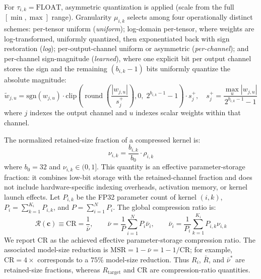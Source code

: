 \documentclass[preprint,12pt,authoryear]{elsarticle}
\begin{document}
\noindent For $\tau_{i,k} = \mathrm{FLOAT}$, asymmetric quantization is applied (scale
from the full $[\min,\max]$ range). Granularity $\mu_{i,k}$ selects among four
operationally distinct schemes: per-tensor uniform (\textit{uniform}); log-domain
per-tensor, where weights are log-transformed, uniformly quantized, then exponentiated
back with sign restoration (\textit{log}); per-output-channel uniform or asymmetric
(\textit{per-channel}); and per-channel sign-magnitude (\textit{learned}), where one
explicit bit per output channel stores the sign and the remaining $(b_{i,k}-1)$ bits
uniformly quantize the absolute magnitude:
\begin{equation}
    \tilde{w}_{j,u} = \mathrm{sgn}(w_{j,u}) \cdot
        \mathrm{clip}\!\left(
            \operatorname{round}\!\left(\frac{|w_{j,u}|}{s_j^+}\right),
            0,\; 2^{b_{i,k}-1}-1
        \right) \cdot s_j^+,
    \quad
    s_j^+ = \frac{\max_u|w_{j,u}|}{2^{b_{i,k}-1}-1}
    \label{eq:sign_magnitude}
\end{equation}
where $j$ indexes the output channel and $u$ indexes scalar weights within that channel.

The normalized retained-size fraction of a compressed kernel is:
\begin{equation}
    \nu_{i,k} = \frac{b_{i,k}}{b_0} \cdot \rho_{i,k}
    \label{eq:compression_ratio}
\end{equation}
where $b_0 = 32$ and $\nu_{i,k}\in(0,1]$. This quantity is an effective
parameter-storage fraction: it combines low-bit storage with the retained-channel fraction
and does not include hardware-specific indexing overheads, activation memory, or kernel
launch effects. Let $P_{i,k}$ be the FP32 parameter count of kernel $(i,k)$,
$P_i=\sum_{k=1}^{K_i}P_{i,k}$, and $P=\sum_{i=1}^{N}P_i$. The global compression ratio is:
\begin{equation}
    \mathcal{R}(\mathbf{c}) \equiv \mathrm{CR} = \frac{1}{\bar{\nu}},
    \qquad
    \bar{\nu} = \frac{1}{P} \sum_{i=1}^{N} P_i\bar{\nu}_i,
    \qquad
    \bar{\nu}_i = \frac{1}{P_i} \sum_{k=1}^{K_i} P_{i,k}\nu_{i,k}
    \label{eq:global_cr}
\end{equation}
\noindent We report CR as the achieved effective parameter-storage compression ratio. The
associated model-size reduction is
$\mathrm{MSR}=1-\bar{\nu}=1-1/\mathrm{CR}$; for example, $\mathrm{CR}=4\times$
corresponds to a $75\%$ model-size reduction. Thus $R_i$, $\bar{R}$, and
$\bar{\nu}^*$ are retained-size fractions, whereas $R_{\mathrm{target}}$ and CR are
compression-ratio quantities.
\end{document}
